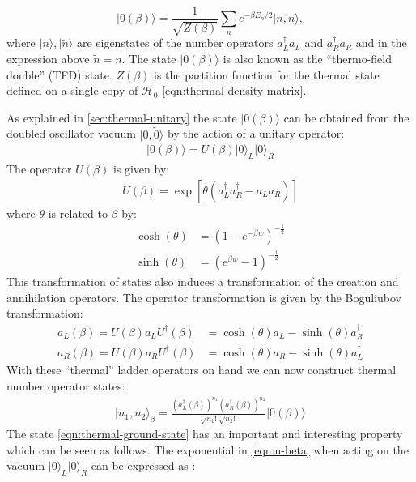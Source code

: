 \documentclass[twocolumn,draft,aps,nofootinbib,nobibnotes,final]{revtex4-2}
\newcommand{\mc}[1]{\mathcal{#1}}
\newcommand{\ket}[1]{\vert #1 \rangle}
\begin{document}
\begin{equation}\label{eqn:tfd-state}
	\ket{0(\beta)} = \frac{1}{\sqrt{Z(\beta)}} \sum_n e^{-\beta E_n /2} \ket{n, \tilde n},
\end{equation}
where $ \ket{n}, \ket{\tilde n} $ are eigenstates of the number operators $ a_L^\dagger a_L $ and $ a_R^\dagger a_R $ and in the expression above $ \tilde n = n $. The state $ \ket{0(\beta)} $ is also known as the ``thermo-field double'' (TFD) state. $ Z(\beta) $ is the partition function for the thermal state defined on a single copy of $ \mc H_0 $ \eqref{eqn:thermal-density-matrix}.

As explained in \autoref{sec:thermal-unitary} the state $ \ket{0(\beta)} $ can be obtained from the doubled oscillator vacuum $ \ket{0,\tilde 0} $ by the action of a unitary operator:
\begin{align}\label{eqn:thermal-ground-state}
	\ket{0(\beta)} = U(\beta)\ket{0}_{L}\ket{0}_{R}
\end{align}
The operator $U(\beta)$ is given by:
\begin{align}\label{eqn:u-beta}
	U(\beta) = \exp[\theta(a_{L}^{\dagger} a_{R}^{\dagger} - a_{L}a_{R})]
\end{align}
where $ \theta $ is related to $\beta$ by:
\begin{align}\label{eqn:theta-beta-relation}
	\cosh(\theta) &= (1-e^{-\beta w})^{-\frac{1}{2}} \\
	\sinh(\theta) &= (e^{\beta w} - 1)^{-\frac{1}{2}}
\end{align}
This transformation of states also induces a transformation of the creation and annihilation operators. The operator transformation is given by the Boguliubov transformation:
\begin{align}\label{eqn:thermal-ladder-ops}
	a_{L}(\beta) = U(\beta) a_{L} U^{\dagger}(\beta) &= \cosh(\theta) a_{L} - \sinh(\theta) a_{R}^{\dagger} \\
	a_{R}(\beta) = U(\beta) a_{R} U^{\dagger}(\beta) &= \cosh(\theta) a_{R} - \sinh(\theta) a_{L}^{\dagger}
\end{align}
With these ``thermal'' ladder operators on hand we can now construct thermal number operator states:
\begin{align}
	\ket{n_{1},n_{2}}_\beta = \frac{(a^{\dagger}_{L}(\beta))^{n_{1}}(a^{\dagger}_{R}(\beta))^{n_{2}}}{\sqrt{n_{1}!}\sqrt{n_{2}!}}\ket{0(\beta)}
\end{align}
The state \eqref{eqn:thermal-ground-state} has an important and interesting property which can be seen as follows. The exponential in \eqref{eqn:u-beta} when acting on the vacuum $ \ket{0}_L \ket{0}_R $ can be expressed as \cite{Guo2020Circuit}:
\end{document}
